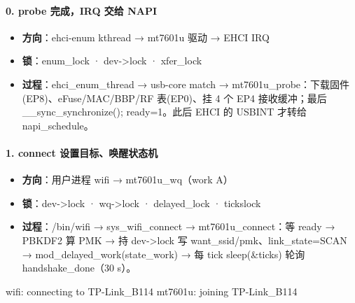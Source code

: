 \paragraph*{0. probe 完成，IRQ 交给 NAPI}
\begin{itemize}[leftmargin=2em,itemsep=1pt]
\item \textbf{方向}：ehci-enum kthread → mt7601u 驱动 → EHCI IRQ
\item \textbf{锁}：enum\_lock · dev->lock · xfer\_lock
\item \textbf{过程}：ehci\_enum\_thread → usb-core match → mt7601u\_probe：下载固件(EP8)、eFuse/MAC/BBP/RF 表(EP0)、挂 4 个 EP4 接收缓冲；最后 \_\_sync\_synchronize(); ready=1。此后 EHCI 的 USBINT 才转给 napi\_schedule。
\end{itemize}

\paragraph*{1. connect 设置目标、唤醒状态机}
\begin{itemize}[leftmargin=2em,itemsep=1pt]
\item \textbf{方向}：用户进程 wifi → mt7601u\_wq（work A）
\item \textbf{锁}：dev->lock · wq->lock · delayed\_lock · tickslock
\item \textbf{过程}：/bin/wifi → sys\_wifi\_connect → mt7601u\_connect：等 ready → PBKDF2 算 PMK → 持 dev->lock 写 want\_ssid/pmk、link\_state=SCAN → mod\_delayed\_work(state\_work) → 每 tick sleep(\&ticks) 轮询 handshake\_done（30 s）。
\end{itemize}
\begin{dbglog}
wifi: connecting to TP-Link_B114
mt7601u: joining TP-Link_B114
\end{dbglog}

